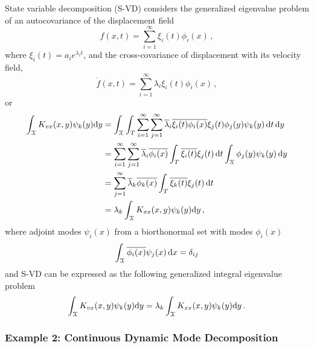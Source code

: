 \documentclass[10pt]{article}
\begin{document}
State variable decomposition (S-VD) considers the generalized eigenvalue problem of an autocovariance of the displacement field 
\begin{equation}
	f(x,t) = \sum_{i=1}^\infty \xi_i(t) \phi_i(x)\,,
\end{equation}
where $\xi_i(t) = a_i e^{\lambda_i t}$, and the cross-covariance of displacement with its velocity field,
\begin{equation}
	\dot f(x,t) = \sum_{i=1}^\infty \lambda_i  \xi_i(t) \phi_i(x)\,,
\end{equation}
or
\begin{equation}
\begin{aligned}
	\int_{\cal X} K_{vx} (x,y) \psi_k(y) \mathrm{d} y 
	&= \int_{\cal X}
	\int_T \sum_{i=1}^\infty \sum_{j=1}^\infty \overline \lambda_i  \overline {\xi_i(t)} \overline {\phi_i(x)}   \xi_j(t) \phi_j(y) \psi_k(y)\, \mathrm{d} t\, \mathrm{d} y\\
	&= \sum_{i=1}^\infty \sum_{j=1}^\infty 
	\overline \lambda_i \overline {\phi_i(x)}  \int_T \overline {\xi_i(t)}  \xi_j(t) \, \mathrm{d} t \int_{\cal X} \phi_j(y) \psi_k(y)\, \mathrm{d} y\\
	&= \sum_{j=1}^\infty 
	\overline \lambda_k \overline {\phi_k(x)}  \int_T \overline {\xi_k(t)}  \xi_j(t) \, \mathrm{d} t \\
	&= \lambda_k \int_{\cal X} K_{xx} (x,y) \psi_k(y) \mathrm{d} y\,,
\end{aligned}
\end{equation}
where adjoint modes $\psi_i(x)$ from a biorthonormal set with modes $\phi_i(x)$
\begin{equation}
	\int_{\cal X} \overline {\phi_i(x)} \psi_j(x) \, \mathrm{d} x = \delta_{ij}
\end{equation}
and S-VD can be expressed as the following generalized integral eigenvalue problem
\begin{equation}
	\int_{\cal X} K_{vx} (x,y) \psi_k(y) \mathrm{d} y = \lambda_k \int_{\cal X} K_{xx} (x,y) \psi_k(y) \mathrm{d} y\,.
\end{equation}

\subsubsection{Example 2: Continuous Dynamic Mode Decomposition}
\end{document}
